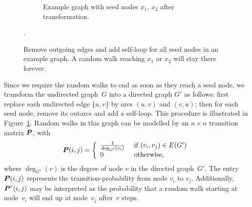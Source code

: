 \begin{figure}
\begin{subfigure}{\textwidth}
    \caption{Example graph with seed nodes $x_1$, $x_2$ after transformation.}
\end{subfigure}
\caption[Removal of outgoing edges of seed nodes in a graph]
{Remove outgoing edges and add self-loop for all seed nodes in an example graph. A random walk reaching $x_1$ or $x_2$ will stay there forever.}
\label{fig:modgraph}.
\end{figure}

Since we require the random walks to end as soon as they reach a seed node, we transform 
the undirected graph~$G$ into a directed graph $G'$ as follows: first replace each undirected 
edge $\{u, v\}$ by arcs $(u, v)$ and $(v, u)$; then for each seed node, remove its 
outarcs and add a self-loop. This procedure is illustrated in Figure~\ref{fig:modgraph}.
Random walks in this graph can be modelled by an $n \times n$ transition matrix $\boldsymbol{P}$, with
\begin{equation}\label{eqn:defining_prob}
	\boldsymbol{P}(i, j) = \left \{ 
							\begin{array}{ll}
                                \frac{1}{\deg_{G'} (v_i)} & \mbox{ if } (v_i, v_j) \in E(G') \\
								0			& \mbox{ otherwise,}
							\end{array}
					\right.
\end{equation}
where $\deg_{G'} (v)$ is the degree of node $v$ in the directed graph~$G'$.
The entry $\boldsymbol{P}(i, j)$ represents the transition-probability from node $v_i$ to $v_j$.
Additionally, $\boldsymbol{P}^r (i, j)$ may be interpreted as the probability that a random 
walk starting at node~$v_i$ will end up at node~$v_j$ after~$r$ steps. 

